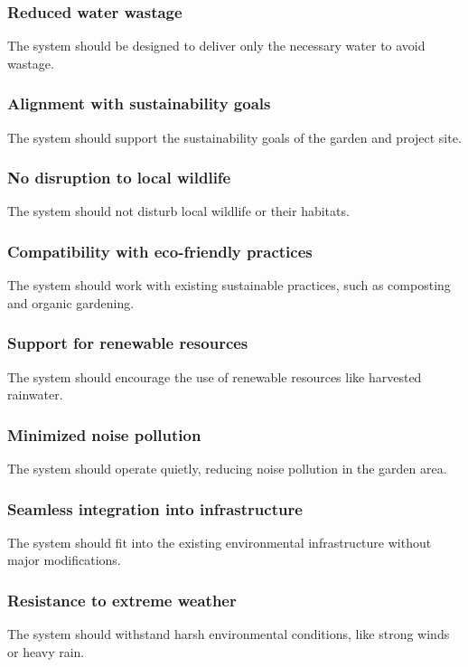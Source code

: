 \documentclass[11pt]{article}
\begin{document}
\subsubsection{Reduced water wastage}
The system should be designed to deliver only the necessary water to avoid wastage.

\subsubsection{Alignment with sustainability goals}
The system should support the sustainability goals of the garden and project site.

\subsubsection{No disruption to local wildlife}
The system should not disturb local wildlife or their habitats.

\subsubsection{Compatibility with eco-friendly practices}
The system should work with existing sustainable practices, such as composting and organic gardening.

\subsubsection{Support for renewable resources}
The system should encourage the use of renewable resources like harvested rainwater.

\subsubsection{Minimized noise pollution}
The system should operate quietly, reducing noise pollution in the garden area.

\subsubsection{Seamless integration into infrastructure}
The system should fit into the existing environmental infrastructure without major modifications.

\subsubsection{Resistance to extreme weather}
The system should withstand harsh environmental conditions, like strong winds or heavy rain.
\end{document}
